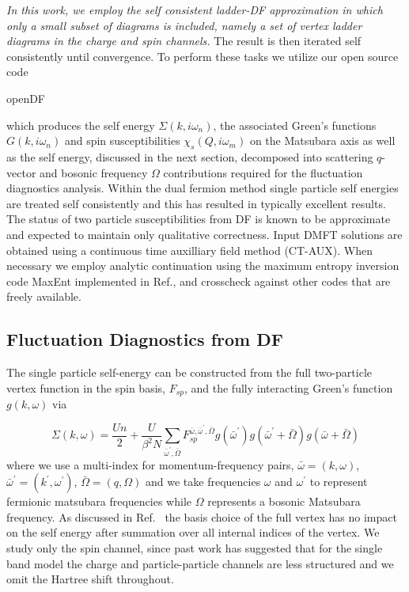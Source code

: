 \documentclass[twocolumn,notitlepage,prb,superscriptaddress,showpacs]{revtex4-1}
\begin{document}
\emph{In this work, we employ the self consistent ladder-DF approximation in which only a small subset of diagrams is included, namely a set of vertex ladder diagrams in the charge and spin channels. }
The result is then iterated self consistently until convergence.
To perform these tasks we utilize our open source code \begin{tt}openDF\end{tt}\cite{Antipov15} which produces the self energy $\Sigma(k,i\omega_n)$, the associated Green's functions $G(k,i\omega_n)$ and spin susceptibilities $\chi_s(Q,i\omega_m)$ on the Matsubara axis as well as the self energy, discussed in the next section, decomposed into scattering $q$-vector and bosonic frequency $\Omega$ contributions required for the fluctuation diagnostics analysis. 
Within the dual fermion method single particle self energies are treated self consistently  and this has resulted in typically excellent results.\cite{gukelberger:2017,benchmarks} The status of two particle susceptibilities from DF is known to be approximate and expected to maintain only qualitative correctness.\cite{leblanc:2019}
Input DMFT solutions are obtained using a continuous time auxilliary field method (CT-AUX).\cite{gull:2011}  When necessary we employ analytic continuation using the maximum entropy inversion code MaxEnt implemented in Ref., and crosscheck against other codes that are freely available.\cite{Gaenko17,wallerberger:2018,triqs} 


\subsection{Fluctuation Diagnostics from DF}

The single particle self-energy can be constructed from the full two-particle vertex function in the spin basis, $F_{sp}$,\cite{Rohringer12} and the fully interacting Green's function $g(k,\omega)$ via

\begin{equation}\label{eqn:fluct}
     \Sigma(k,\omega)= \frac{Un}{2}+ \frac{U}{\beta^2 N} \sum \limits_{\bar{\omega}^\prime ,\bar{\Omega}} F_{sp}^{\bar{\omega},\bar{\omega}^\prime,\bar{\Omega}} g(\bar{\omega}^\prime)g(\bar{\omega}^\prime +\bar{\Omega}) g(\bar{\omega}+\bar{\Omega})
\end{equation}
where we use a multi-index for momentum-frequency pairs, $\bar{\omega}=(k,\omega)$, $\bar{\omega}^\prime=(k^\prime,\omega^\prime)$, $\bar{\Omega}=(q,\Omega)$ and we take frequencies $\omega$ and $\omega^\prime$ to represent fermionic matsubara frequencies while $\Omega$ represents a bosonic Matsubara frequency.
As discussed in Ref.~ the basis choice of the full vertex has no impact on the self energy after summation over all internal indices of the vertex.  We study only the spin channel, since past work has suggested that for the single band model the charge and particle-particle channels are less structured and we omit the Hartree shift throughout.
\end{document}
